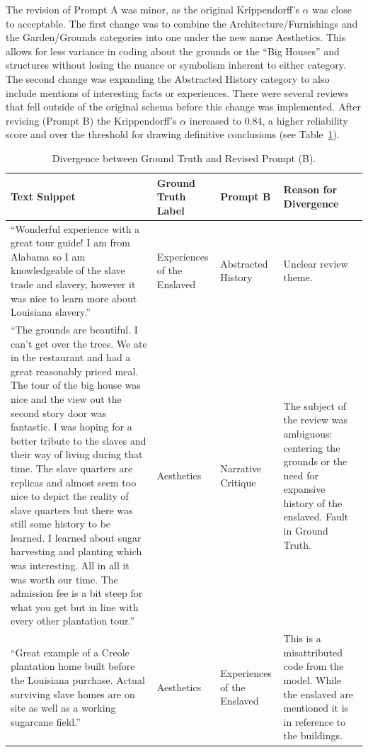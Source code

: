 \documentclass[final]{anthology-ch} %
\begin{document}
The revision of Prompt A was minor, as the original Krippendorff's $\alpha$ was close to acceptable. The first change was to combine the Architecture/Furnishings and the Garden/Grounds categories into one under the new name Aesthetics. This allows for less variance in coding about the grounds or the \enquote{Big Houses} and structures without losing the nuance or symbolism inherent to either category. The second change was expanding the Abstracted History category to also include mentions of interesting facts or experiences. There were several reviews that fell outside of the original schema before this change was implemented. After revising (Prompt B) the Krippendorff's $\alpha$ increased to 0.84, a higher reliability score and over the threshold for drawing definitive conclusions (see Table~\ref{tab:divergence}).

\begin{table}[h]
  \centering
  \footnotesize
  \begin{tabular}{@{}p{4.4cm}p{1.9cm}p{1.9cm}p{3.4cm}@{}}
    \toprule
    \textbf{Text Snippet} & \textbf{Ground Truth Label} & \textbf{Prompt B} & \textbf{Reason for Divergence} \\
    \midrule
    \enquote{Wonderful experience with a great tour guide! I am from Alabama so I am knowledgeable of the slave trade and slavery, however it was nice to learn more about Louisiana slavery.} & Experiences of the Enslaved & Abstracted History & Unclear review theme. \\
    \addlinespace
    \enquote{The grounds are beautiful. I can't get over the trees. We ate in the restaurant and had a great reasonably priced meal. The tour of the big house was nice and the view out the second story door was fantastic. I was hoping for a better tribute to the slaves and their way of living during that time. The slave quarters are replicas and almost seem too nice to depict the reality of slave quarters but there was still some history to be learned. I learned about sugar harvesting and planting which was interesting. All in all it was worth our time. The admission fee is a bit steep for what you get but in line with every other plantation tour.} & Aesthetics & Narrative Critique & The subject of the review was ambiguous: centering the grounds or the need for expansive history of the enslaved. Fault in Ground Truth. \\
    \addlinespace
    \enquote{Great example of a Creole plantation home built before the Louisiana purchase. Actual surviving slave homes are on site as well as a working sugarcane field.} & Aesthetics & Experiences of the Enslaved & This is a misattributed code from the model. While the enslaved are mentioned it is in reference to the buildings. \\
    \bottomrule
  \end{tabular}
  \caption{Divergence between Ground Truth and Revised Prompt (B).}
  \label{tab:divergence}
\end{table}
\end{document}
